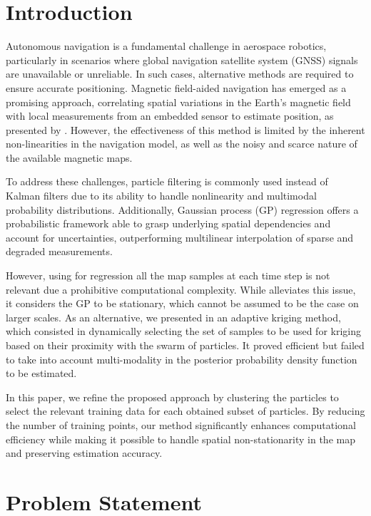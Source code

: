 \documentclass[conference]{IEEEtran}
\begin{document}
\section{Introduction}

Autonomous navigation is a fundamental challenge in aerospace robotics, particularly in scenarios where global navigation satellite system (GNSS) signals are unavailable or unreliable. In such cases, alternative methods are required to ensure accurate positioning. Magnetic field-aided navigation has emerged as a promising approach, correlating spatial variations in the Earth's magnetic field with local measurements from an embedded sensor to estimate position, as presented by \cite{bib:canciani}. However, the effectiveness of this method is limited by the inherent non-linearities in the navigation model, as well as the noisy and scarce nature of the available magnetic maps.

To address these challenges, particle filtering is commonly used instead of Kalman filters due to its ability to handle nonlinearity and multimodal probability distributions. Additionally, Gaussian process (GP) regression offers a probabilistic framework able to grasp underlying spatial dependencies and account for uncertainties, outperforming multilinear interpolation of sparse and degraded measurements.

However, using for regression all the map samples at each time step is not relevant due a prohibitive computational complexity. While \cite{bib:reduced-rank} alleviates this issue, it considers the GP to be stationary, which cannot be assumed to be the case on larger scales. As an alternative, we presented in \cite{bib:AK-RPF} an adaptive kriging method, which consisted in dynamically selecting the set of samples to be used for kriging based on their proximity with the swarm of particles. It proved efficient but failed to take into account multi-modality in the posterior probability density function to be estimated. 

In this paper, we refine the proposed approach by clustering the particles to select the relevant training data for each obtained subset of particles. By reducing the number of training points, our method significantly enhances computational efficiency while making it possible to handle spatial non-stationarity in the map and preserving estimation accuracy.

\section{Problem Statement}
\end{document}
